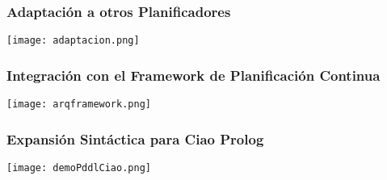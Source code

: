 \documentclass[bigger]{beamer}
\begin{document}
\begin{frame}
\frametitle{Adaptación a otros Planificadores}
\label{sec-6.3}

\begin{center}\texttt{[image: adaptacion.png]}\end{center}
\end{frame}
\begin{frame}
\frametitle{Integración con el Framework de Planificación Continua}
\label{sec-6.4}

\begin{center}\texttt{[image: arqframework.png]}\end{center}
\end{frame}
\begin{frame}
\frametitle{Expansión Sintáctica para Ciao Prolog}
\label{sec-6.5}

\begin{center}\texttt{[image: demoPddlCiao.png]}\end{center}
\end{frame}
\end{document}
